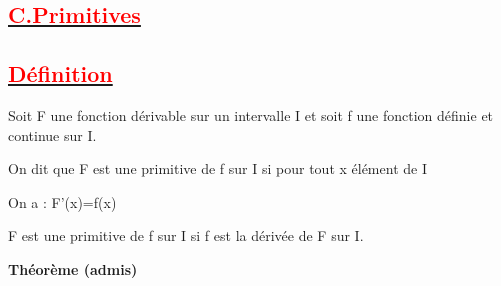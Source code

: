 \documentclass[12pt]{article}
\newcounter{solution}
\begin{document}


\subsection*{\underline{\textbf{\textcolor{red}{C.Primitives}}}}
\subsection*{\underline{\textbf{\textcolor{red}{Définition}}}}
Soit F une fonction dérivable sur un intervalle I et soit f une fonction définie et continue sur I.
 
On dit que F est une primitive de f sur I si pour tout x élément de I

On a : F'(x)=f(x)

F est une primitive de f sur I si f est la dérivée de F sur I.

\textbf{Théorème (admis)}
\end{document}

